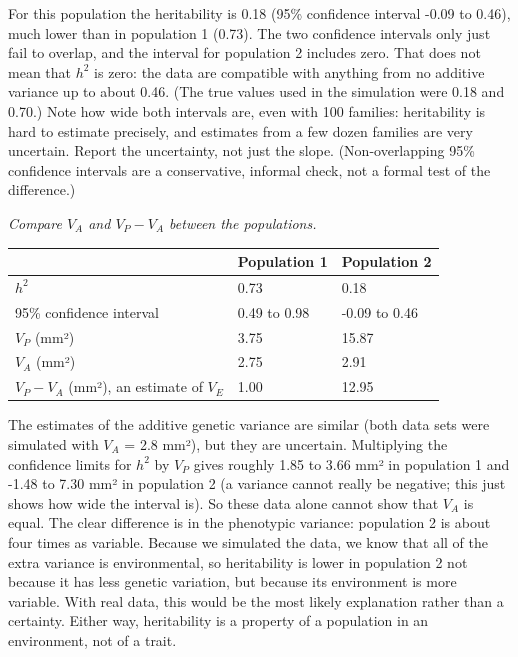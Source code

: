 \documentclass[
  a4paper]{book}
\newcounter{none} %
\begin{document}
For this population the heritability is 0.18 (95\% confidence interval -0.09 to 0.46), much lower than in population 1 (0.73). The two confidence intervals only just fail to overlap, and the interval for population 2 includes zero. That does not mean that \(h^2\) is zero: the data are compatible with anything from no additive variance up to about 0.46. (The true values used in the simulation were 0.18 and 0.70.) Note how wide both intervals are, even with 100 families: heritability is hard to estimate precisely, and estimates from a few dozen families are very uncertain. Report the uncertainty, not just the slope. (Non-overlapping 95\% confidence intervals are a conservative, informal check, not a formal test of the difference.)

\emph{Compare \(V_A\) and \(V_P - V_A\) between the populations.}

{\def\LTcaptype{none} %
\begin{longtable}[]{@{}lll@{}}
\toprule\noalign{}
& Population 1 & Population 2 \\
\midrule\noalign{}
\endhead
\bottomrule\noalign{}
\endlastfoot
\(h^2\) & 0.73 & 0.18 \\
95\% confidence interval & 0.49 to 0.98 & -0.09 to 0.46 \\
\(V_P\) (mm²) & 3.75 & 15.87 \\
\(V_A\) (mm²) & 2.75 & 2.91 \\
\(V_P - V_A\) (mm²), an estimate of \(V_E\) & 1.00 & 12.95 \\
\end{longtable}
}

The estimates of the additive genetic variance are similar (both data sets were simulated with \(V_A\) = 2.8 mm²), but they are uncertain. Multiplying the confidence limits for \(h^2\) by \(V_P\) gives roughly 1.85 to 3.66 mm² in population 1 and -1.48 to 7.30 mm² in population 2 (a variance cannot really be negative; this just shows how wide the interval is). So these data alone cannot show that \(V_A\) is equal. The clear difference is in the phenotypic variance: population 2 is about four times as variable. Because we simulated the data, we know that all of the extra variance is environmental, so heritability is lower in population 2 not because it has less genetic variation, but because its environment is more variable. With real data, this would be the most likely explanation rather than a certainty. Either way, heritability is a property of a population in an environment, not of a trait.
\end{document}
